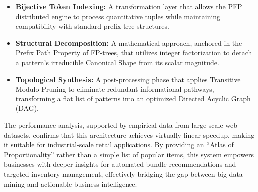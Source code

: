 \documentclass[10pt, twocolumn]{article}
\begin{document}
\begin{itemize}
    \item \textbf{Bijective Token Indexing:} A transformation layer that allows
          the PFP distributed engine to process quantitative tuples while maintaining
          compatibility with standard prefix-tree structures.

    \item \textbf{Structural Decomposition:} A mathematical approach, anchored
          in the Prefix Path Property of FP-trees, that utilizes integer factorization to
          detach a pattern’s irreducible Canonical Shape from its scalar magnitude.

    \item \textbf{Topological Synthesis:} A post-processing phase that applies
          Transitive Modulo Pruning to eliminate redundant informational pathways,
          transforming a flat list of patterns into an optimized Directed Acyclic Graph
          (DAG).
\end{itemize}

The performance analysis, supported by empirical data from large-scale web
datasets, confirms that this architecture achieves virtually linear speedup,
making it suitable for industrial-scale retail applications. By providing an
``Atlas of Proportionality'' rather than a simple list of popular items, this
system empowers businesses with deeper insights for automated bundle
recommendations and targeted inventory management, effectively bridging the gap
between big data mining and actionable business intelligence.
\end{document}

